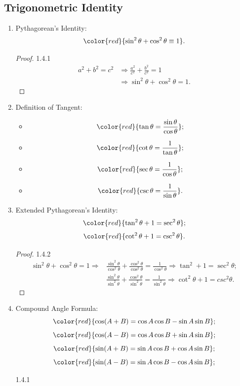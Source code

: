 \documentclass[12pt, a4paper]{article}
\begin{document}
\subsection{Trigonometric Identity}
\begin{enumerate}
  \item Pythagorean's Identity: 
  $${\color{red}{\sin^2\theta+\cos^2\theta\equiv1}}.$$
  \begin{proof}{1.4.1}{}
    $$\begin{aligned}
      a^2+b^2=c^2&\Rightarrow\frac{a^2}{c^2}+\frac{b^2}{c^2}=1\\
      &\Rightarrow\sin^2\theta+\cos^2\theta=1.
    \end{aligned}$$
  \end{proof}
  \item Definition of Tangent: 
  \begin{itemize}
    \item $${\color{red}{\tan\theta=\frac{\sin\theta}{\cos\theta}}};$$
    \item $${\color{red}{\cot\theta=\frac{1}{\tan\theta}}};$$
    \item $${\color{red}{\sec\theta=\frac{1}{\cos\theta}}};$$
    \item $${\color{red}{\csc\theta=\frac{1}{\sin\theta}}}.$$
  \end{itemize}
  \item Extended Pythagorean's Identity: 
  $${\color{red}{\tan^2\theta+1=\sec^2\theta}};$$
  $${\color{red}{\cot^2\theta+1=\csc^2\theta}}.$$
  \begin{proof}{1.4.2}{}
    $$\begin{aligned}
      \sin^2\theta+\cos^2\theta=1\Rightarrow&\frac{\sin^2\theta}{\cos^2\theta}+\frac{\cos^2\theta}{\cos^2\theta}=\frac{1}{\cos^2\theta}\Rightarrow\tan^2+1=\sec^2\theta;\\
      &\frac{\sin^2\theta}{\sin^2\theta}+\frac{\cos^2\theta}{\sin^2\theta}=\frac{1}{\sin^2\theta}\Rightarrow\cot^2\theta+1=csc^2\theta.
    \end{aligned}$$
    {\color{green}{N.B.: a reflex angle is an angle bigger than $180^\circ$, smaller than $360^\circ$.}}
  \end{proof}
  \item Compound Angle Formula: 
  $${\color{red}{\cos(A+B)=\cos{A}\cos{B}-\sin{A}\sin{B}}};$$
  $${\color{red}{\cos(A-B)=\cos{A}\cos{B}+\sin{A}\sin{B}}};$$
  $${\color{red}{\sin(A+B)=\sin{A}\cos{B}+\cos{A}\sin{B}}};$$
  $${\color{red}{\sin(A-B)=\sin{A}\cos{B}-\cos{A}\sin{B}}};$$
  \begin{example}{1.4.1}{}

\end{example}
\end{enumerate}
\end{document}
